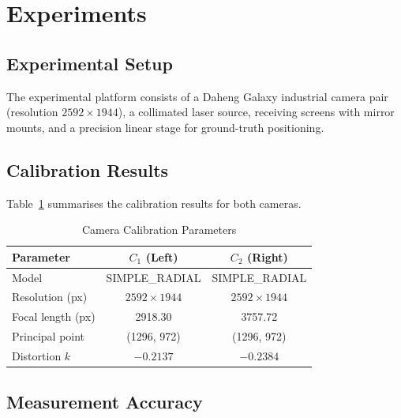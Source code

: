 \section{Experiments}
\label{sec:experiments}



\subsection{Experimental Setup}

The experimental platform consists of a Daheng Galaxy
industrial camera pair (resolution $2592 \times 1944$),
a collimated laser source, receiving screens with
mirror mounts, and a precision linear stage for
ground-truth positioning.



\subsection{Calibration Results}

Table~\ref{tab:calib} summarises the calibration results
for both cameras.

\begin{table}[!t]
  \caption{Camera Calibration Parameters
           \label{tab:calib}}
  \centering
  \small
  \begin{tabular}{lcc}
    \toprule
    Parameter & $C_1$ (Left) & $C_2$ (Right) \\
    \midrule
    Model            & SIMPLE\_RADIAL & SIMPLE\_RADIAL \\
    Resolution (px)  & $2592\times1944$ & $2592\times1944$ \\
    Focal length (px) & 2918.30 & 3757.72 \\
    Principal point  & (1296, 972) & (1296, 972) \\
    Distortion $k$   & $-0.2137$ & $-0.2384$ \\
    \bottomrule
  \end{tabular}
\end{table}



\subsection{Measurement Accuracy}

